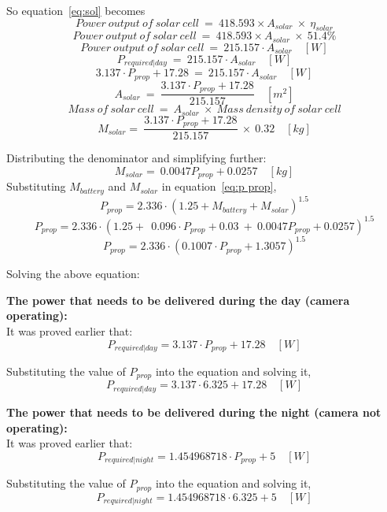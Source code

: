 So equation~\ref{eq:sol} becomes
\[ Power \ output \ of \ solar \ cell \ = \ 418.593 \times A_{solar} \ \times \ \eta_{solar} \]
\[ Power \ output \ of \ solar \ cell \ = \ 418.593 \times A_{solar} \ \times \ 51.4\% \]
\[ Power \ output \ of \ solar \ cell \ = \ 215.157 \cdot A_{solar} \quad [W] \]
\[ P_{required|day} \ = \ 215.157 \cdot A_{solar} \quad [W] \]
\[ 3.137 \cdot P_{prop} + 17.28 \ = \ 215.157 \cdot A_{solar} \quad [W] \]
\[ A_{solar} \ = \ \frac{ 3.137 \cdot P_{prop} + 17.28 }{ 215.157 } \quad [m^2] \]
\[ Mass \ of \ solar \ cell \ = \ A_{solar} \ \times \ Mass \ density \ of \ solar \ cell \]
\[ M_{solar} = \ \frac{ 3.137 \cdot P_{prop} + 17.28 }{ 215.157 } \ \times \ 0.32 \quad [kg] \]

Distributing the denominator and simplifying further:
\[ M_{solar} = \ 0.0047 P_{prop} + 0.0257  \quad [kg] \]
\vspace{0.5cm}
\p Substituting $ M_{battery} $ and $ M_{solar} $ in equation~\ref{eq:p prop},
\[ P_{prop} = 2.336 \cdot (1.25 + M_{battery} + M_{solar})^{1.5} \]
\[ P_{prop} = 2.336 \cdot (1.25 + \ \ 0.096 \cdot P_{prop} + 0.03 \ + \ 0.0047 P_{prop} + 0.0257 )^{1.5} \]
\[ P_{prop} = 2.336 \cdot ( 0.1007 \cdot P_{prop} + 1.3057 )^{1.5} \]

Solving the above equation: 
\boxone

\vspace{1cm}

\p \textbf{The power that needs to be delivered during the day (camera operating):}
\vspace{0.1cm}\\
It was proved earlier that:
\[ P_{required|day} = 3.137 \cdot P_{prop} + 17.28 \quad [W] \]

Substituting the value of $ P_{prop} $ into the equation and solving it,
\[ P_{required|day} = 3.137 \cdot 6.325 + 17.28 \quad [W] \]
\boxtwo

\vspace{1cm}

\p \textbf{The power that needs to be delivered during the night (camera not operating):}
\vspace{0.1cm}\\
It was proved earlier that:
\[ P_{required | night} = 1.454968718 \cdot P_{prop} + 5 \quad [W] \]

Substituting the value of $ P_{prop} $ into the equation and solving it,
\[ P_{required | night} = 1.454968718 \cdot 6.325 + 5 \quad [W] \]
\boxthree

\vspace{1cm}


